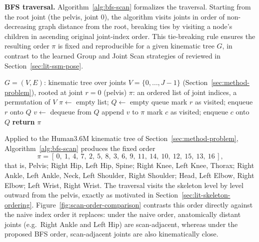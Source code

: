 \textbf{BFS traversal.} Algorithm~\ref{alg:bfs-scan} formalizes the
traversal. Starting from the root joint (the pelvis, joint 0), the
algorithm visits joints in order of non-decreasing graph distance from the
root, breaking ties by visiting a node's children in
ascending original joint-index order. This tie-breaking rule ensures the
resulting order $\pi$ is fixed and reproducible for a given kinematic tree
$G$, in contrast to the learned Group and
Joint Scan strategies of \cite{nguyen2025skeletonmamba} reviewed in
Section~\ref{sec:lit-ssm-pose}.

\renewcommand{\algorithmicrequire}{\textbf{Input:}}
\renewcommand{\algorithmicensure}{\textbf{Output:}}
\renewcommand{\algorithmicforall}{\textbf{for each}}
\begin{algorithm}
\caption{Breadth-First Search Kinematic-Tree Scan Order}
\label{alg:bfs-scan}
\begin{algorithmic}
  \REQUIRE $G=(V,E)$: kinematic tree over joints $V=\{0,\ldots,J-1\}$
    (Section~\ref{sec:method-problem}), rooted at joint $r=0$ (pelvis)
  \ENSURE $\pi$: an ordered list of joint indices, a permutation of $V$
  \STATE $\pi \gets$ empty list; $Q \gets$ empty queue
  \STATE mark $r$ as visited; enqueue $r$ onto $Q$
    \STATE $v \gets$ dequeue from $Q$
    \STATE append $v$ to $\pi$
        \STATE mark $c$ as visited; enqueue $c$ onto $Q$
      \ENDIF
    \ENDFOR
  \ENDWHILE
  \STATE \textbf{return} $\pi$
\end{algorithmic}
\end{algorithm}

Applied to the Human3.6M kinematic tree of Section~\ref{sec:method-problem},
Algorithm~\ref{alg:bfs-scan} produces the fixed order
\[
\pi = [\,0,\ 1,\ 4,\ 7,\ 2,\ 5,\ 8,\ 3,\ 6,\ 9,\ 11,\ 14,\ 10,\ 12,\ 15,\ 13,\ 16\,],
\]
that is, Pelvis; Right Hip, Left Hip, Spine; Right Knee, Left Knee, Thorax;
Right Ankle, Left Ankle, Neck, Left Shoulder, Right Shoulder; Head, Left
Elbow, Right Elbow; Left Wrist, Right Wrist. The traversal visits the
skeleton level by level outward from the pelvis, exactly as motivated in
Section~\ref{sec:lit-skeleton-ordering}. Figure~\ref{fig:scan-order-comparison}
contrasts this order directly against the naive index order it replaces:
under the naive order, anatomically distant joints (e.g.\ Right Ankle and
Left Hip) are scan-adjacent, whereas under the proposed BFS order,
scan-adjacent joints are also kinematically close.

